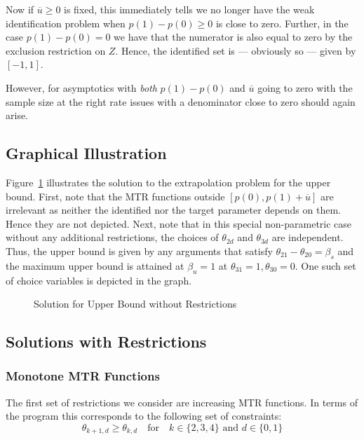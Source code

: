\documentclass[11pt,a4paper,english]{article} %
\numberwithin{equation}{section}
\numberwithin{figure}{section}
\numberwithin{table}{section}
\theoremstyle{definition}
\theoremstyle{remark}
\begin{document}
Now if $\overline{u}\geq0$ is fixed, this immediately tells we no longer have the weak identification problem when $p(1) - p(0)\geq0$ is close to zero. Further, in the case $p(1) - p(0) = 0$ we have that the numerator is also equal to zero by the exclusion restriction on $Z$. Hence, the identified set is --- obviously so --- given by $[-1, 1]$.

However, for asymptotics with \textit{both} $p(1) - p(0)$ and $\overline{u}$ going to zero with the sample size at the right rate issues with a denominator close to zero should again arise.

\subsection{Graphical Illustration}
Figure~\ref{fig:sm_upper_no_restr} illustrates the solution to the extrapolation problem for the upper bound.
First, note that the MTR functions outside $[p(0), p(1) + \overline{u}]$ are irrelevant as neither the identified nor the target parameter depends on them. Hence they are not depicted.
Next, note that in this special non-parametric case without any additional restrictions, the choices of $\theta_{2d}$ and $\theta_{3d}$ are independent.
Thus, the upper bound is given by any arguments that satisfy $\theta_{21} - \theta_{20} = \beta_s$ and the maximum upper bound is attained at $\beta_u = 1$ at $\theta_{31} = 1, \theta_{30} = 0$.
One such set of choice variables is depicted in the graph.

\begin{figure}
	
	\caption{Solution for Upper Bound without Restrictions}\label{fig:sm_upper_no_restr}
\end{figure}

\subsection{Solutions with Restrictions}
\subsubsection{Monotone MTR Functions}
The first set of restrictions we consider are increasing MTR functions.
In terms of the program this corresponds to the following set of constraints:
\begin{equation}
	\theta_{k+1,d} \geq \theta_{k,d} \quad \text{for} \quad k \in \{2, 3, 4\} \text{ and } d \in \{0,1\}
\end{equation}
\end{document}
